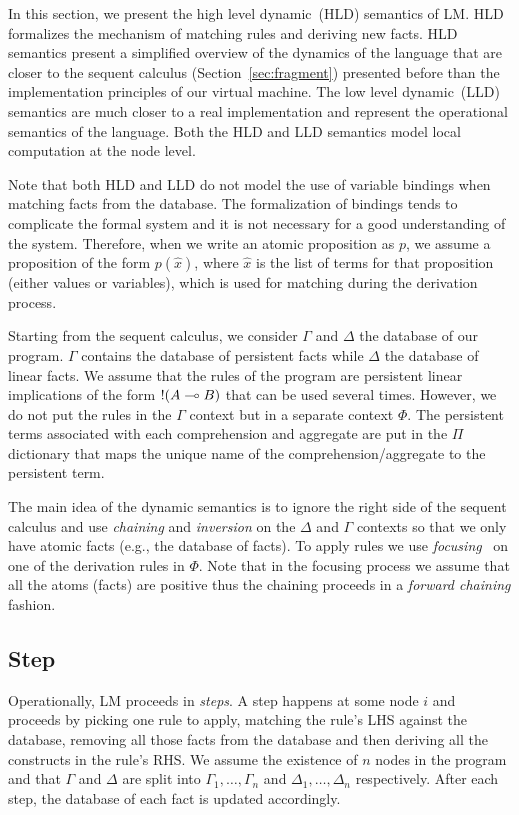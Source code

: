
In this section, we present the high level dynamic~(HLD) semantics of LM.  HLD
formalizes the mechanism of matching rules and deriving new facts.  HLD
semantics present a simplified overview of the dynamics of the language that are
closer to the sequent calculus (Section~\ref{sec:fragment}) presented before
than the implementation principles of our virtual machine. The low level
dynamic~(LLD) semantics are much closer to a real implementation and
represent the operational semantics of the language. Both the HLD and LLD
semantics model local computation at the node level.

Note that both HLD and LLD do not model the use of variable bindings when
matching facts from the database. The formalization of bindings tends to
complicate the formal system and it is not necessary for a good understanding of
the system. Therefore, when we write an atomic proposition as $p$, we assume a
proposition of the form $p(\widehat{x})$, where $\widehat{x}$ is the list of
terms for that proposition (either values or variables), which is used for
matching during the derivation process.

Starting from the sequent calculus, we consider $\Gamma$ and $\Delta$ the
database of our program. $\Gamma$ contains the database of persistent facts
while $\Delta$ the database of linear facts. We assume that the rules of the
program are persistent linear implications of the form ${!} (A \multimap B)$ that
can be used several times. However, we do not put the rules in the $\Gamma$
context but in a separate context $\Phi$. The persistent terms associated with
each comprehension and aggregate are put in the $\Pi$ dictionary that maps the
unique name of the comprehension/aggregate to the persistent term.

The main idea of the dynamic semantics is to ignore the right side of the
sequent calculus and use \emph{chaining} and \emph{inversion} on the $\Delta$
and $\Gamma$ contexts so that we only have atomic facts (e.g., the database of
facts). To apply rules we use
\emph{focusing}~\cite{Andreoli92logicprogramming} on one of the derivation rules
in $\Phi$. Note that in the focusing process we assume that all the atoms
(facts) are positive thus the chaining proceeds in a \emph{forward chaining}
fashion.

\subsection{Step}\label{sec:step_hld}

Operationally, LM proceeds in \emph{steps}. A step happens at some node $i$ and
proceeds by picking one rule to apply, matching the rule's LHS against the
database, removing all those facts from the database and then deriving all the
constructs in the rule's RHS. We assume the existence of $n$ nodes in the
program and that $\Gamma$ and $\Delta$ are split into $\Gamma_1, \dotsc,
\Gamma_n$ and $\Delta_1, \dotsc, \Delta_n$ respectively. After each step, the
database of each fact is updated accordingly.

